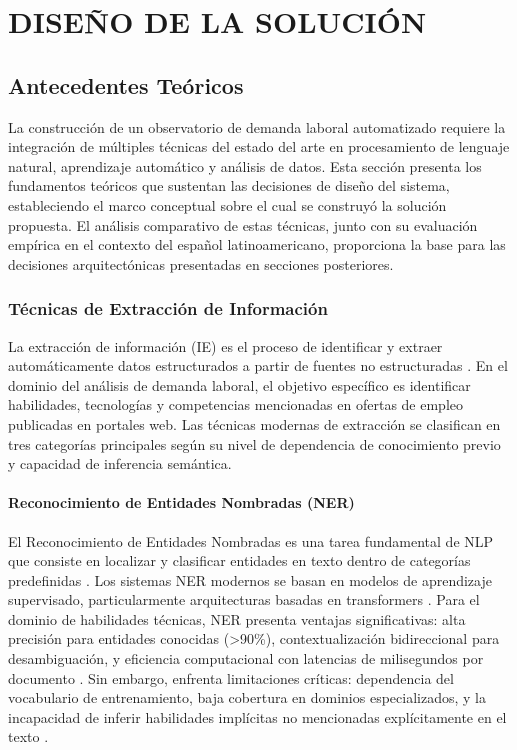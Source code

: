 \chapter{DISEÑO DE LA SOLUCIÓN}

\section{Antecedentes Teóricos}

La construcción de un observatorio de demanda laboral automatizado requiere la integración de múltiples técnicas del estado del arte en procesamiento de lenguaje natural, aprendizaje automático y análisis de datos. Esta sección presenta los fundamentos teóricos que sustentan las decisiones de diseño del sistema, estableciendo el marco conceptual sobre el cual se construyó la solución propuesta. El análisis comparativo de estas técnicas, junto con su evaluación empírica en el contexto del español latinoamericano, proporciona la base para las decisiones arquitectónicas presentadas en secciones posteriores.

\subsection{Técnicas de Extracción de Información}

La extracción de información (IE) es el proceso de identificar y extraer automáticamente datos estructurados a partir de fuentes no estructuradas \cite{sarawagi2008}. En el dominio del análisis de demanda laboral, el objetivo específico es identificar habilidades, tecnologías y competencias mencionadas en ofertas de empleo publicadas en portales web. Las técnicas modernas de extracción se clasifican en tres categorías principales según su nivel de dependencia de conocimiento previo y capacidad de inferencia semántica.

\subsubsection{Reconocimiento de Entidades Nombradas (NER)}

El Reconocimiento de Entidades Nombradas es una tarea fundamental de NLP que consiste en localizar y clasificar entidades en texto dentro de categorías predefinidas \cite{nadeau2007}. Los sistemas NER modernos se basan en modelos de aprendizaje supervisado, particularmente arquitecturas basadas en transformers \cite{devlin2019}. Para el dominio de habilidades técnicas, NER presenta ventajas significativas: alta precisión para entidades conocidas (>90\%), contextualización bidireccional para desambiguación, y eficiencia computacional con latencias de milisegundos por documento \cite{zhang2018}. Sin embargo, enfrenta limitaciones críticas: dependencia del vocabulario de entrenamiento, baja cobertura en dominios especializados, y la incapacidad de inferir habilidades implícitas no mencionadas explícitamente en el texto \cite{canete2020}.

